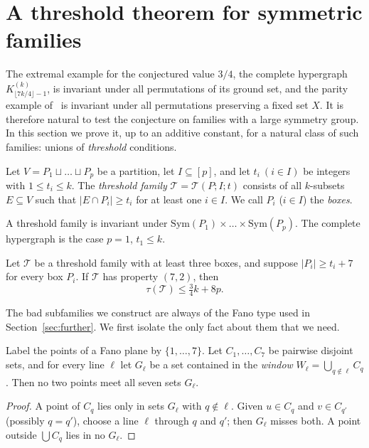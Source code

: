 \section{A threshold theorem for symmetric families}\label{sec:threshold}

The extremal example for the conjectured value $3/4$, the complete hypergraph $K^{(k)}_{\lfloor 7k/4\rfloor-1}$, is invariant under all permutations of its ground set, and the parity example of~\cite{FKW} is invariant under all permutations preserving a fixed set $X$. It is therefore natural to test the conjecture on families with a large symmetry group. In this section we prove it, up to an additive constant, for a natural class of such families: unions of \emph{threshold} conditions.

\begin{definition}\label{def:threshold}
Let $V=P_1\sqcup\dots\sqcup P_p$ be a partition, let $I\subseteq[p]$, and let $t_i\ (i\in I)$ be integers with $1\le t_i\le k$. The \emph{threshold family} $\mathcal T=\mathcal T(P;I;t)$ consists of all $k$-subsets $E\subseteq V$ such that $|E\cap P_i|\ge t_i$ for at least one $i\in I$. We call $P_i$ ($i\in I$) the \emph{boxes}.
\end{definition}

A threshold family is invariant under $\mathrm{Sym}(P_1)\times\dots\times\mathrm{Sym}(P_p)$. The complete hypergraph is the case $p=1$, $t_1\le k$.

\begin{theorem}\label{thm:threshold}
Let $\mathcal T$ be a threshold family with at least three boxes, and suppose $|P_i|\ge t_i+7$ for every box $P_i$. If $\mathcal T$ has property $(7,2)$, then
\[
\tau(\mathcal T)\le \tfrac34k+8p .
\]
\end{theorem}

The bad subfamilies we construct are always of the Fano type used in Section~\ref{sec:further}. We first isolate the only fact about them that we need.

\begin{lemma}\label{lem:fanowindows}
Label the points of a Fano plane by $\{1,\dots,7\}$. Let $C_1,\dots,C_7$ be pairwise disjoint sets, and for every line $\ell$ let $G_\ell$ be a set contained in the \emph{window} $W_\ell=\bigcup_{q\notin\ell}C_q$. Then no two points meet all seven sets $G_\ell$.
\end{lemma}

\begin{proof}
A point of $C_q$ lies only in sets $G_\ell$ with $q\notin\ell$. Given $u\in C_q$ and $v\in C_{q'}$ (possibly $q=q'$), choose a line $\ell$ through $q$ and $q'$; then $G_\ell$ misses both. A point outside $\bigcup C_q$ lies in no $G_\ell$.
\end{proof}

